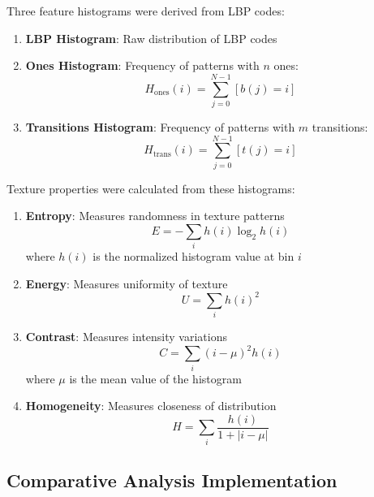 \documentclass[a4paper,12pt]{report}
\begin{document}
Three feature histograms were derived from LBP codes:

\begin{enumerate}
    \item \textbf{LBP Histogram}: Raw distribution of LBP codes
    
    \item \textbf{Ones Histogram}: Frequency of patterns with $n$ ones:
    \begin{equation}
    H_{\text{ones}}(i) = \sum_{j=0}^{N-1} [b(j) = i]
    \end{equation}
    
    \item \textbf{Transitions Histogram}: Frequency of patterns with $m$ transitions:
    \begin{equation}
    H_{\text{trans}}(i) = \sum_{j=0}^{N-1} [t(j) = i]
    \end{equation}
\end{enumerate}

Texture properties were calculated from these histograms:

\begin{enumerate}
    \item \textbf{Entropy}: Measures randomness in texture patterns
    \begin{equation}
    E = -\sum_{i} h(i) \log_2 h(i)
    \end{equation}
    where $h(i)$ is the normalized histogram value at bin $i$
    
    \item \textbf{Energy}: Measures uniformity of texture
    \begin{equation}
    U = \sum_{i} h(i)^2
    \end{equation}
    
    \item \textbf{Contrast}: Measures intensity variations
    \begin{equation}
    C = \sum_{i} (i - \mu)^2 h(i)
    \end{equation}
    where $\mu$ is the mean value of the histogram
    
    \item \textbf{Homogeneity}: Measures closeness of distribution
    \begin{equation}
    H = \sum_{i} \frac{h(i)}{1 + |i - \mu|}
    \end{equation}
\end{enumerate}


\subsection{Comparative Analysis Implementation}
\end{document}
